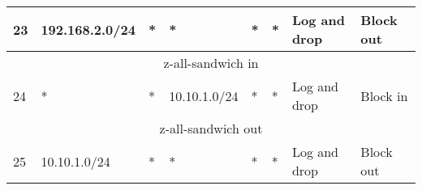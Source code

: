 \documentclass[a4paper, 11pt, oneside]{article}
\begin{document}
\begin{table}[H]
{\begin{tabular}{|llllllll|}
\multicolumn{1}{|l|}{23}                        & \multicolumn{1}{l|}{192.168.2.0/24}                                               & \multicolumn{1}{l|}{*}                                                              & \multicolumn{1}{l|}{*}                                                                 & \multicolumn{1}{l|}{*}                                                                   & \multicolumn{1}{l|}{*}                 & \multicolumn{1}{l|}{Log and drop}    & Block out                              \\ \hline
\multicolumn{8}{|c|}{{\color[HTML]{FE0000} z-all-sandwich in}}                                                                                                                                                                                                                                                                                                                                                                                                                                                                         \\ \hline
\multicolumn{1}{|l|}{24}                        & \multicolumn{1}{l|}{*}                                                            & \multicolumn{1}{l|}{*}                                                              & \multicolumn{1}{l|}{10.10.1.0/24}                                                      & \multicolumn{1}{l|}{*}                                                                   & \multicolumn{1}{l|}{*}                 & \multicolumn{1}{l|}{Log and drop}    & Block in                               \\ \hline
\multicolumn{8}{|c|}{{\color[HTML]{FE0000} z-all-sandwich out}}                                                                                                                                                                                                                                                                                                                                                                                                                                                                        \\ \hline
\multicolumn{1}{|l|}{25}                        & \multicolumn{1}{l|}{10.10.1.0/24}                                                 & \multicolumn{1}{l|}{*}                                                              & \multicolumn{1}{l|}{*}                                                                 & \multicolumn{1}{l|}{*}                                                                   & \multicolumn{1}{l|}{*}                 & \multicolumn{1}{l|}{Log and drop}    & Block out                              \\ \hline

\end{tabular}}
\end{table}
\end{document}
